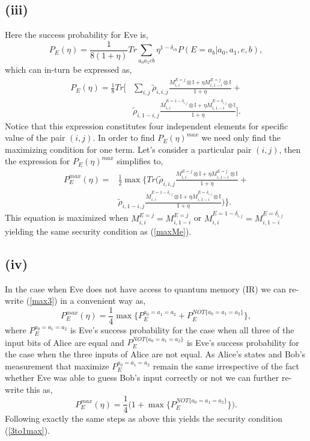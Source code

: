 \documentclass[smallextended]{svjour3}
\begin{document}
\subsection*{(iii)}
Here the success probability for Eve is,
\begin{equation}
P_E(\eta)= \frac{1}{8(1+\eta)}Tr \sum_{a_0a_1eb} \eta^{1-\delta_{eb}}P(E=a_b|a_0,a_1,e,b),
\end{equation}
which can in-turn be expressed as,
\begin{equation}
\begin{split}
P_E(\eta)= \frac{1}{8} Tr\bigg[ & \sum_{i,j} \tilde{\rho}_{i,i,j} \frac{M_{i,i}^{E=j} \otimes \mathbb{I} + \eta M_{i,1-i}^{E=j} \otimes \mathbb{I} }{1 + \eta} + \\ & \tilde{\rho}_{i,1-i,j} \frac{M_{i,i}^{E=1-\delta_{i,j}} \otimes \mathbb{I} + \eta M_{i,1-i}^{E=\delta_{i,j}} \otimes \mathbb{I} }{1 + \eta} \bigg].
\end{split}
\end{equation}
Notice that this expression constitutes four independent elements  for specific value of the pair $(i,j)$. In order to find $P_E(\eta)^{max}$ we need only find the maximizing condition for one term. Let's consider a particular pair $(i,j)$, then the expression for $P_E(\eta)^{max}$ simplifies to,
\begin{equation}
\begin{split}
P_E^{max}(\eta)= & \frac{1}{2} \max \bigg\{ Tr\bigg(  \tilde{\rho}_{i,i,j} \frac{M_{i,i}^{E=j} \otimes \mathbb{I} + \eta M_{i,1-i}^{E=j} \otimes \mathbb{I} }{1 + \eta} + \\ & \tilde{\rho}_{i,1-i,j} \frac{M_{i,i}^{E=1-\delta_{i,j}} \otimes \mathbb{I} + \eta M_{i,1-i}^{E=\delta_{i,j}} \otimes \mathbb{I} }{1 + \eta} \bigg) \bigg\}.
\end{split}
\end{equation}
This equation is maximized when $M_{i,i}^{E=j}=M_{i,1-i}^{E=j}$ or $M_{i,i}^{E=1-\delta_{i,j}}=M_{i,1-i}^{E=\delta_{i,j}}$ yielding the same security condition as (\ref{maxMe}).
\subsection*{(iv)}
In the case when Eve does not have access to quantum memory (IR) we can re-write (\ref{max3}) in a convenient way as,
\begin{equation}
P_E^{max}(\eta)=\frac{1}{4}\max \bigg\{P_E^{a_0=a_1=a_2} + P_E^{NOT\{a_0=a_1=a_2\}} \bigg\},
\end{equation}
where $P_E^{a_0=a_1=a_2}$ is Eve's success probability for the case when all three of the input bits of Alice are equal and $P_E^{NOT\{a_0=a_1=a_2\} }$ is Eve's success probability for the case when the three inputs of Alice are not equal. As Alice's states and Bob's measurement that maximize $P_E^{a_0=a_1=a_2}$ remain the same irrespective of the fact whether Eve was able to guess Bob's input correctly or not we can further re-write this as,
\begin{equation}
P_E^{max}(\eta)=\frac{1}{4}\bigg( 1 + \max \bigg\{P_E^{NOT\{a_0=a_1=a_2\}} \bigg\} \bigg).
\end{equation}
Following exactly the same steps as above this yields the security condition (\ref{3to1max}).
\end{document}
